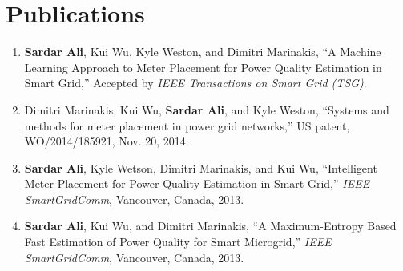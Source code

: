 \chapter*{Publications}
\label{chap:publications}
\begin{enumerate}  
\item \textbf{Sardar Ali}, Kui Wu, Kyle Weston, and Dimitri Marinakis, ``A Machine Learning Approach to Meter Placement for Power Quality Estimation in Smart Grid,'' Accepted by \textit{IEEE Transactions on Smart Grid (TSG)}.

\item Dimitri Marinakis, Kui Wu, \textbf{Sardar Ali}, and Kyle Weston, ``Systems and methods for meter placement in power grid networks,'' US patent, WO/2014/185921, Nov. 20, 2014.

\item \textbf{Sardar Ali}, Kyle Wetson, Dimitri Marinakis, and Kui Wu, ``Intelligent Meter Placement for Power Quality Estimation in Smart Grid,'' \textit{IEEE SmartGridComm}, Vancouver, Canada, 2013.

\item \textbf{Sardar Ali}, Kui Wu, and Dimitri Marinakis, ``A Maximum-Entropy Based Fast Estimation of Power Quality for Smart Microgrid,'' \textit{IEEE SmartGridComm}, Vancouver, Canada, 2013.
\end{enumerate}